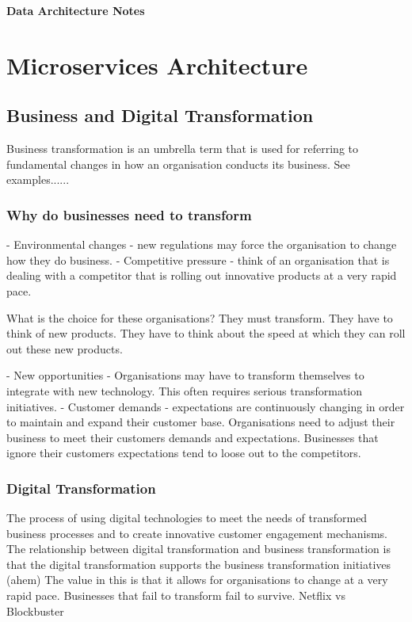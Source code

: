 \documentclass[a4paper, 11pt]{book}
\begin{document}
    \begin{titlepage}
        \centering
        \vspace*{2in}
        \Huge \textbf{Data Architecture Notes}
    \end{titlepage}

    \setcounter{section}{0}

    \newpage

    \tableofcontents
    \newpage

    \listoffigures
    \newpage


    \chapter{Microservices Architecture}

    \section{Business and Digital Transformation}
    Business transformation is an umbrella term that is used for referring to fundamental changes in how an organisation conducts its business.
    See examples......

    \subsection{Why do businesses need to transform}
    - Environmental changes - new regulations may force the organisation to change how they do business.
    - Competitive pressure - think of an organisation that is dealing with a competitor that is rolling out innovative products at a very rapid pace.

    What is the choice for these organisations?
    They must transform.
    They have to think of new products.
    They have to think about the speed at which they can roll out these new products.

    - New opportunities - Organisations may have to transform themselves to integrate with new technology.
    This often requires serious transformation initiatives.
    - Customer demands - expectations are continuously changing in order to maintain and expand their customer base.
    Organisations need to adjust their business to meet their customers demands and expectations.
    Businesses that ignore their customers expectations tend to loose out to the competitors.

    \subsection{Digital Transformation}
    The process of using digital technologies to meet the needs of transformed business processes and to create innovative customer engagement mechanisms.
    The relationship between digital transformation and business transformation is that the digital transformation supports the business transformation initiatives (ahem)
    The value in this is that it allows for organisations to change at a very rapid pace.
    Businesses that fail to transform fail to survive.
    Netflix vs Blockbuster
\end{document}
